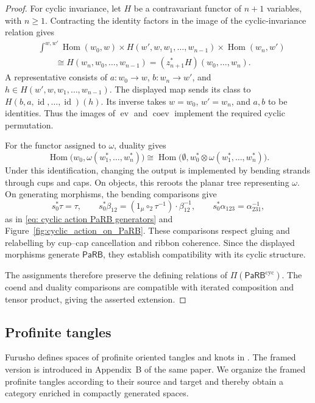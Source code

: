 \documentclass{amsart}
\newcommand{\PaRB}{\mathsf{PaRB}}
\newcommand{\twist}{\tau}
\newcommand{\id}{\operatorname{id}}
\newcommand{\Hom}{\operatorname{Hom}}
\newcommand{\ev}{\operatorname{ev}}
\newcommand{\coev}{\operatorname{coev}}
\theoremstyle{definition}
\numberwithin{equation}{section}
\begin{document}
\begin{proof}
For cyclic invariance, let $H$ be a contravariant functor of
$n+1$ variables, with $n\geq1$. Contracting the identity
factors in the image of the cyclic-invariance relation gives
\[
\begin{aligned}
&\int^{w,w'}
\Hom(w_0,w)\times
H(w',w,w_1,\ldots,w_{n-1})\times
\Hom(w_n,w')\\
&\qquad\cong
H(w_n,w_0,\ldots,w_{n-1})
=(z_{n+1}^*H)(w_0,\ldots,w_n).
\end{aligned}
\]
A representative consists of $a\colon w_0\to w$,
$b\colon w_n\to w'$, and
$h\in H(w',w,w_1,\ldots,w_{n-1})$.
The displayed map sends its class to
$H(b,a,\id,\ldots,\id)(h)$.
Its inverse takes $w=w_0$, $w'=w_n$, and $a,b$ to be
identities. Thus the images of $\ev$ and $\coev$ implement
the required cyclic permutation.

For the functor assigned to $\omega$, duality gives
\[
\Hom\bigl(w_0,\omega(w_1^*,\ldots,w_n^*)\bigr)
\cong
\Hom\bigl(
\emptyset,w_0^*\otimes\omega(w_1^*,\ldots,w_n^*)
\bigr).
\]
Under this identification, changing the output is implemented
by bending strands through cups and caps. On objects, this
reroots the planar tree representing $\omega$. On generating
morphisms, the bending comparisons give
\[
s_0^*\twist=\twist,\qquad
s_0^*\beta_{12}
=(1_\mu\circ_2\twist^{-1})\cdot\beta_{12}^{-1},
\qquad
s_0^*\alpha_{123}=\alpha_{231}^{-1},
\]
as in \eqref{eq: cyclic action PaRB generators} and
Figure~\ref{fig:cyclic_action_on_PaRB}.
These comparisons respect gluing and relabelling by cup--cap
cancellation and ribbon coherence. Since the displayed morphisms
generate $\PaRB$, they establish compatibility with its cyclic
structure.

The assignments therefore preserve the defining relations of
$\Pi(\PaRB^{\mathrm{cyc}})$. The coend and duality comparisons
are compatible with iterated composition and tensor product,
giving the asserted extension.
\end{proof}

\subsection{Profinite tangles}
\label{subsec: profinite tangles}

Furusho defines spaces of profinite oriented tangles and knots in
\cite{furusho_galois_2017}. The framed version is introduced in
Appendix~B of the same paper. We organize the framed profinite
tangles according to their source and target and thereby obtain a
category enriched in compactly generated spaces.
\end{document}
